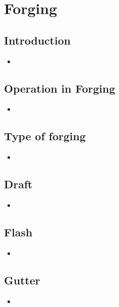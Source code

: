 \documentclass[8pt]{report}
\begin{document}
\chapter{Forging}
\section{Introduction}
	\begin{itemize}
		\item
	\end{itemize}\hrulefill
\section{Operation in Forging}
	\begin{itemize}
		\item
	\end{itemize}\hrulefill
\section{Type of forging}
	\begin{itemize}
		\item
	\end{itemize}\hrulefill
\section{Draft}
	\begin{itemize}
		\item
	\end{itemize}\hrulefill
\section{Flash}
	\begin{itemize}
		\item
	\end{itemize}\hrulefill
\section{Gutter}
	\begin{itemize}
		\item
	\end{itemize}\hrulefill
\end{document}
